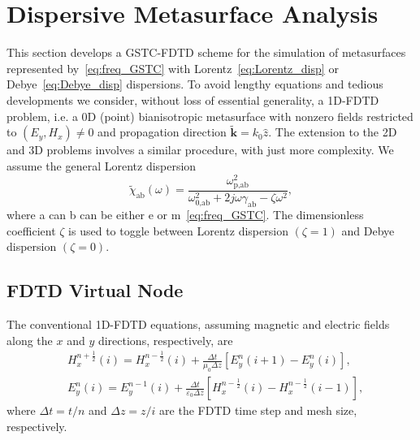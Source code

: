 \documentclass[journal]{IEEEtran}
\begin{document}
\section{Dispersive Metasurface Analysis}\label{sec:formulation}
This section develops a GSTC-FDTD scheme for the simulation of metasurfaces represented by~\eqref{eq:freq_GSTC} with Lorentz~\eqref{eq:Lorentz_disp} or Debye~\eqref{eq:Debye_disp} dispersions. To avoid lengthy equations and tedious developments we consider, without loss of essential generality, a 1D-FDTD problem, i.e. a 0D (point) bianisotropic metasurface with nonzero fields restricted to $(E_y,H_x)\neq0$ and propagation direction $\tilde{\textbf{k}}=k_0\hat{z}$. The extension to the 2D and 3D problems involves a similar procedure, with just more complexity. We assume the general Lorentz dispersion
\begin{equation}\label{eq:ms_DeborLoren}
   \tilde{\chi}_\textrm{ab}(\omega)=\frac{\omega_\textrm{p,ab}^2}{\omega_\textrm{0,ab}^2+2j\omega\gamma_\textrm{ab}-\zeta\omega^2},
\end{equation}
where a can  b can be either e or m~\eqref{eq:freq_GSTC}. The dimensionless coefficient $\zeta$ is used to toggle between Lorentz dispersion $\left(\zeta=1\right)$ and Debye dispersion $\left(\zeta=0\right)$.

\subsection{FDTD Virtual Node}
The conventional 1D-FDTD equations, assuming magnetic and electric fields along the $x$ and $y$ directions, respectively, are~\cite{Susan_FDTD2005}
\begin{subequations}\label{eq:regularFDTD}
   \begin{align}\label{eq:regularFDTD_1}
     &H_x^{n+\frac{1}{2}}\left(i\right)=H_x^{n-\frac{1}{2}}\left(i\right)+\frac{\Delta t}{\mu_0\Delta z}\left[E_y^n\left(i+1\right)-E_y^n\left(i\right)\right],\\\label{eq:regularFDTD_2}
     &E_y^n \left( i\right)=E_y^{n-1}\left( i\right)+\frac{\Delta t}{\varepsilon_0\Delta z}\left[H_x^{n-\frac{1}{2}}\left(i \right) -H_x^{n-\frac{1}{2}}\left( i-1\right)\right],
   \end{align}
\end{subequations}
where $\Delta t=t/n$ and $\Delta z=z/i$ are the FDTD time step and mesh size, respectively.
\end{document}
